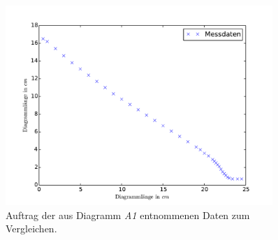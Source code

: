 \begin{figure}[p]
	\centering
	\includegraphics[width=0.9\textwidth]{Bilder/Vert_kalt.pdf}
	\caption{Auftrag der aus Diagramm \emph{A1} entnommenen Daten zum Vergleichen.\cite{matplotlib}}
	\label{fig:E_vert_kalt}
\end{figure}
